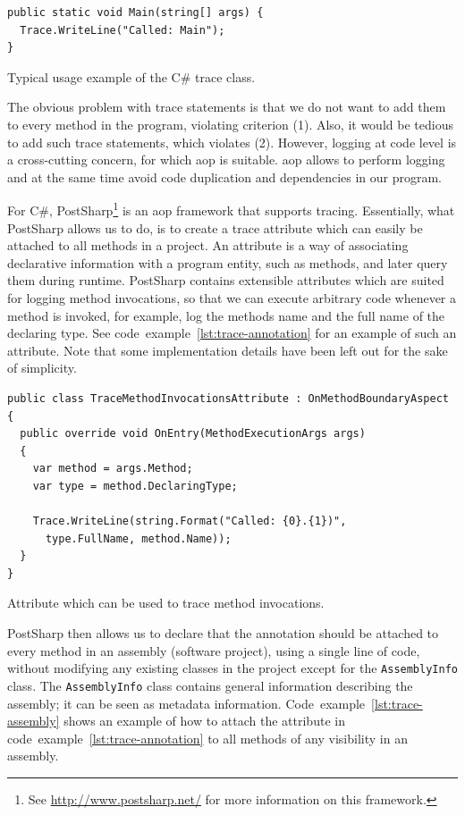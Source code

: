 \documentclass[a4paper,english,12pt]{report}
\newcommand{\textcf}{\texttt}
\begin{document}
\begin{listing}[htbp]
{\footnotesize
\begin{verbatim}
public static void Main(string[] args) {
  Trace.WriteLine("Called: Main");
}
\end{verbatim}
}
\caption{Typical usage example of the C\# trace class.}
\label{lst:trace}
\end{listing}

The obvious problem with trace statements is that we do not want to add them to every method in the program, violating criterion (1). Also, it would be tedious to add such trace statements, which violates (2). However, logging at code level is a cross-cutting concern, for which \gls{aop} is suitable. \gls{aop} allows to perform logging and at the same time  avoid code duplication and dependencies in our program. 

For C\#, PostSharp\footnote{See \url{http://www.postsharp.net/} for more information on this framework.} is an \gls{aop} framework that supports tracing. Essentially, what PostSharp allows us to do, is to create a trace attribute which can easily be attached to all methods in a project. An attribute is a way of associating declarative information with a program entity, such as methods, and later query them during runtime. PostSharp contains extensible attributes which are suited for logging method invocations, so that we can execute arbitrary code whenever a method is invoked, for example, log the methods name and the full name of the declaring type. See code~example~\ref{lst:trace-annotation} for an example of such an attribute. Note that some implementation details have been left out for the sake of simplicity.

\begin{listing}[tb]
{\footnotesize
\begin{verbatim}
public class TraceMethodInvocationsAttribute : OnMethodBoundaryAspect
{
  public override void OnEntry(MethodExecutionArgs args)
  {
    var method = args.Method;
    var type = method.DeclaringType;

    Trace.WriteLine(string.Format("Called: {0}.{1})", 
      type.FullName, method.Name));
  }
}
\end{verbatim}
}
\caption{Attribute which can be used to trace method invocations.}
\label{lst:trace-annotation}
\end{listing}

PostSharp then allows us to declare that the annotation should be attached to every method in an assembly (software project), using a single line of code, without modifying any existing classes in the project except for the \textcf{AssemblyInfo} class. The \textcf{AssemblyInfo} class contains general information describing the assembly; it can be seen as metadata information. Code~example~\vref{lst:trace-assembly} shows an example of how to attach the attribute in code~example~\vref{lst:trace-annotation} to all methods of any visibility in an assembly.
\end{document}

